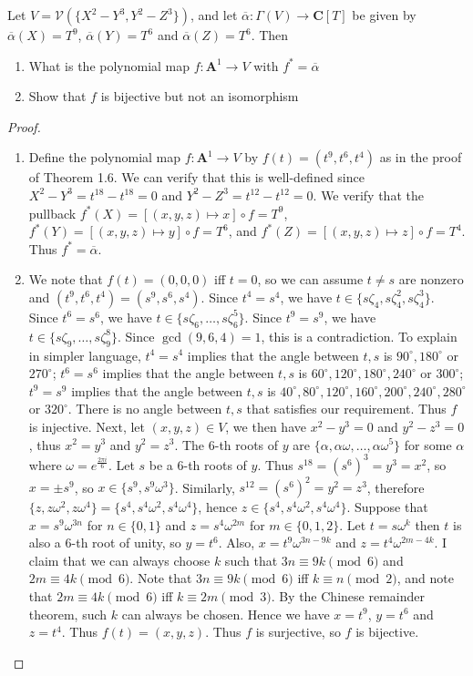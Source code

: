 \documentclass[11pt]{book}
\begin{document}
\newpage
\begin{problem}
Let $V=\mathcal{V}(\{X^2-Y^3,Y^2-Z^3\})$, and let $\overline{\alpha}:\Gamma (V)\rightarrow \mathbf C[T]$ be given by $\overline{\alpha}(X)=T^9$, $\overline{\alpha}(Y)=T^6$ and $\overline{\alpha}(Z)=T^6$. Then
\begin{enumerate}[label=(\alph*)]
	\item What is the polynomial map $f:\mathbf A^1\rightarrow V$ with $f^*=\overline{\alpha}$
	\item Show that $f$ is bijective but not an isomorphism
\end{enumerate}
\begin{proof}~\\[-1em]
\begin{enumerate}[label=(\alph*)]
	\item Define the polynomial map $f:\mathbf A^1\rightarrow V$ by $f(t)=(t^9,t^6,t^4)$ as in the proof of Theorem 1.6. We can verify that this is well-defined since $X^2-Y^3=t^{18}-t^{18}=0$ and $Y^2-Z^3=t^{12}-t^{12}=0$. We verify that the pullback $f^*(X)=[(x,y,z)\mapsto x]\circ f=T^9$, $f^*(Y)=[(x,y,z)\mapsto y]\circ f=T^6$, and $f^*(Z)=[(x,y,z)\mapsto z]\circ f=T^4$. Thus $f^*=\overline{\alpha}$.
	\item We note that $f(t)=(0,0,0)$ iff $t=0$, so we can assume $t\ne s$ are nonzero and $(t^9,t^6,t^4)=(s^9,s^6,s^4)$. Since $t^4=s^4$, we have $t\in \{ s\zeta_4, s\zeta_4^2,s \zeta_4^3\}$. Since $t^6=s^6$, we have $t\in \{ s\zeta_6, \dots, s \zeta_6^5\}$. Since $t^9=s^9$, we have $t\in \{ s\zeta_9, \dots,s\zeta_9^8\}$. Since $\gcd(9,6,4)=1$, this is a contradiction. To explain in simpler language, $t^4=s^4$ implies that the angle between $t,s$ is $90^\circ,180^\circ$ or $270^\circ$; $t^6=s^6$ implies that the angle between $t,s$ is $60^\circ,120^\circ,180^\circ,240^\circ$ or $300^\circ$; $t^9=s^9$ implies that the angle between $t,s$ is $40^\circ,80^\circ,120^\circ,160^\circ,200^\circ,240^\circ,280^\circ$ or $320^\circ$. There is no angle between $t,s$ that satisfies our requirement. Thus $f$ is injective. Next, let $(x,y,z)\in V$, we then have $x^2-y^3=0$ and $y^2-z^3=0$, thus $x^2=y^3$ and $y^2=z^3$. The $6$-th roots of $y$ are $\{\alpha,\alpha\omega,\dots,\alpha\omega^5\}$ for some $\alpha$ where $\omega=e^{\frac{2\pi i}{6}}$. Let $s$ be a $6$-th roots of $y$. Thus $s^{18}=(s^{6})^3=y^3=x^2$, so $x=\pm s^{9}$, so $x\in \{s^9,s^9\omega^3\}$. Similarly, $s^{12}=(s^6)^2=y^2=z^3$, therefore $\{z,z\omega^2,z\omega^4\}=\{s^4,s^4\omega^2,s^4\omega^4\}$, hence $z\in \{s^4,s^4\omega^2,s^4\omega^4\}$. Suppose that $x=s^9\omega^{3n}$ for $n\in\{0,1\}$ and $z=s^4\omega^{2m}$ for $m\in\{0,1,2\}$. Let $t=s\omega^{k}$ then $t$ is also a $6$-th root of unity, so $y=t^6$. Also, $x=t^9\omega^{3n-9k}$ and $z=t^4\omega^{2m-4k}$. I claim that we can always choose $k$ such that $3n\equiv 9k\pmod{6}$ and $2m\equiv 4k\pmod{6}$. Note that $3n\equiv 9k\pmod{6}$ iff $k\equiv n\pmod{2}$, and note that $2m\equiv 4k\pmod{6}$ iff $k\equiv 2m\pmod{3}$. By the Chinese remainder theorem, such $k$ can always be chosen. Hence we have $x=t^9$, $y=t^6$ and $z=t^4$. Thus $f(t)=(x,y,z)$. Thus $f$ is surjective, so $f$ is bijective. 


\end{enumerate}
\end{proof}
\end{problem}
\end{document}
